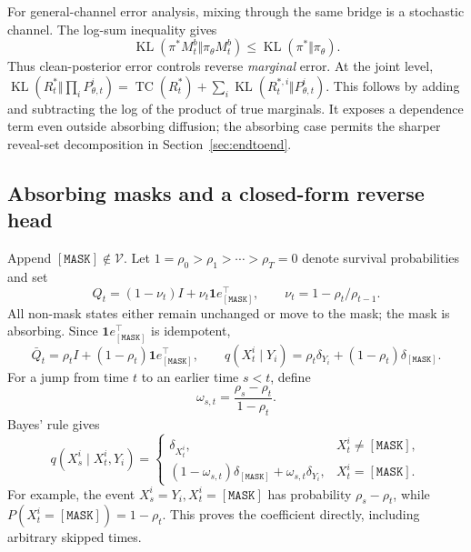 \documentclass{article}
\theoremstyle{remark}\newtheorem{remark}[theorem]{Remark}
\newcommand{\KL}{\operatorname{KL}}
\newcommand{\mask}{\mathtt{[MASK]}}
\begin{document}
For general-channel error analysis, mixing through the same bridge is a stochastic channel. The log-sum inequality gives
\begin{equation}
 \KL(\pi^*M_t^b\Vert\pi_\theta M_t^b)\le\KL(\pi^*\Vert\pi_\theta).
 \label{eq:bridgecontraction}
\end{equation}
Thus clean-posterior error controls reverse \emph{marginal} error. At the joint level,
$\KL(R_t^*\Vert\prod_iP_{\theta,t}^i)
=\operatorname{TC}(R_t^*)+\sum_i\KL(R_t^{*,i}\Vert P_{\theta,t}^i)$.
This follows by adding and subtracting the log of the product of true marginals. It exposes a dependence term even outside absorbing diffusion; the absorbing case permits the sharper reveal-set decomposition in Section~\ref{sec:endtoend}.

\subsection{Absorbing masks and a closed-form reverse head}
Append $\mask\notin\mathcal V$. Let $1=\rho_0>\rho_1>\cdots>\rho_T=0$ denote survival probabilities and set
\begin{equation}
 Q_t=(1-\nu_t)I+\nu_t\mathbf1e_{\mask}^{\top},
 \qquad \nu_t=1-\rho_t/\rho_{t-1}.
 \label{eq:maskmatrix}
\end{equation}
All non-mask states either remain unchanged or move to the mask; the mask is absorbing. Since $\mathbf1e_{\mask}^{\top}$ is idempotent,
\begin{equation}
 \bar Q_t=\rho_t I+(1-\rho_t)\mathbf1e_{\mask}^{\top},\qquad
 q(X_t^i\mid Y_i)=\rho_t\delta_{Y_i}+(1-\rho_t)\delta_{\mask}.
 \label{eq:maskmarginal}
\end{equation}
For a jump from time $t$ to an earlier time $s<t$, define
\begin{equation}
 \omega_{s,t}=\frac{\rho_s-\rho_t}{1-\rho_t}.
\end{equation}
Bayes' rule gives
\begin{equation}
 q(X_s^i\mid X_t^i,Y_i)=
 \begin{cases}
 \delta_{X_t^i},&X_t^i\ne\mask,\\
 (1-\omega_{s,t})\delta_{\mask}+\omega_{s,t}\delta_{Y_i},&X_t^i=\mask.
 \end{cases}
 \label{eq:maskbridge}
\end{equation}
For example, the event $X_s^i=Y_i,X_t^i=\mask$ has probability $\rho_s-\rho_t$, while $P(X_t^i=\mask)=1-\rho_t$. This proves the coefficient directly, including arbitrary skipped times.
\end{document}
